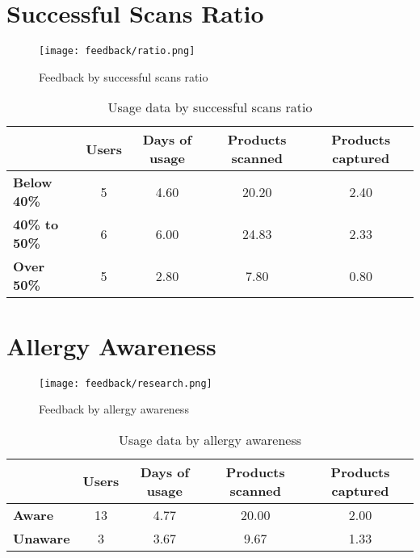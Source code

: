 \section{Successful Scans Ratio}

    \begin{figure}[H]
      \centering
      \texttt{[image: feedback/ratio.png]}
      \caption{Feedback by successful scans ratio}
      \label{fig:feedback-ratio}
      \end{figure}
      
    \begin{table}[H]
        \begin{tabular}{l|c|c|c|c|}
        \cline{2-5}
            & Users & Days of usage & Products scanned & Products captured \\ \hline
            \multicolumn{1}{|l|}{\textbf{Below 40\%}}     & 5          & 4.60          & 20.20            & 2.40              \\ \hline
            \multicolumn{1}{|l|}{\textbf{40\% to 50\%}}     & 6          & 6.00          & 24.83            & 2.33              \\ \hline
            \multicolumn{1}{|l|}{\textbf{Over 50\%}} & 5           & 2.80          & 7.80            & 0.80              \\ \hline
        \end{tabular}
        \caption{Usage data by successful scans ratio}
        \label{tab:usage-ratio}
    \end{table}

\section{Allergy Awareness}

    \begin{figure}[H]
      \centering
      \texttt{[image: feedback/research.png]}
      \caption{Feedback by allergy awareness}
      \label{fig:feedback-research}
      \end{figure}
      
    \begin{table}[H]
        \begin{tabular}{l|c|c|c|c|}
        \cline{2-5}
            & Users & Days of usage & Products scanned & Products captured \\ \hline
            \multicolumn{1}{|l|}{\textbf{Aware}}     & 13          & 4.77          & 20.00            & 2.00              \\ \hline
            \multicolumn{1}{|l|}{\textbf{Unaware}}     & 3          & 3.67          & 9.67            & 1.33              \\ \hline
        \end{tabular}
        \caption{Usage data by allergy awareness}
        \label{tab:usage-research}
    \end{table}